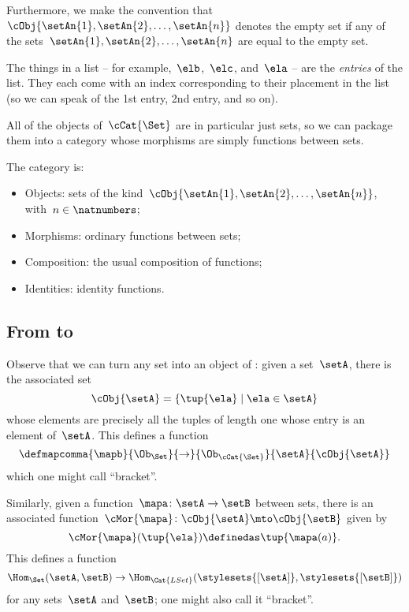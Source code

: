 Furthermore, we make the convention that~$\cObj{\setAn{1}, \setAn{2}, \ldots, \setAn{n}}$ denotes the empty set if any of the sets~$\setAn{1}, \setAn{2}, \ldots , \setAn{n}$ are equal to the empty set.

The things in a list -- for example,~$\elb$,~$\elc$, and~$\ela$ -- are the \emph{entries} of the list.
They each come with an index corresponding to their placement in the list (so we can speak of the 1st entry, 2nd entry, and so on).

All of the objects of~$\cCat{\Set}$ are in particular just sets, so we can package them into a category whose morphisms are simply functions between sets.

\begin{ctdefinition}[\cCat{\Set}]
    The category \cCat{\Set} is:
    \begin{itemize}
        \item Objects: sets of the kind~$\cObj{\setAn{1}, \setAn{2}, \ldots, \setAn{n}}$, with~$n \in \natnumbers$;
        \item Morphisms: ordinary functions between sets;
        \item Composition: the usual composition of functions;
        \item Identities: identity functions.
    \end{itemize}
\end{ctdefinition}

\subsection{From \Set to \cCat{\Set}}

Observe that we can turn any set into an object of \cCat{\Set}: given a set~$\setA$, there is the associated set
\begin{equation*}
    \cObj{\setA} = \{ \tup{\ela} \mid \ela \in \setA \}
\end{equation*}
whose elements are precisely all the tuples of length one whose entry is an element of~$\setA$.
This defines a function
\begin{equation*}
    \defmapcomma{\mapb}{\Ob_{\Set}}
    {\to}
    {\Ob_{\cCat{\Set}}}
    {\setA }
    {\cObj{\setA}}
\end{equation*}
which one might call ``bracket''.

Similarly, given a function~$\mapa \colon \setA \to \setB$ between sets, there is an associated function~$\cMor{ \mapa }\colon \cObj{\setA} \mto \cObj{\setB}$ given by
\begin{equation*}
    \cMor{ \mapa } ( \tup{ \ela }) \definedas \tup{\mapa(a)}.
\end{equation*}
This defines a function
\begin{equation*}
    \Hom_{\Set}(\setA,\setB) \to \Hom_{\Cat{LSet}}(\stylesets{[\setA]},\stylesets{[\setB]})
\end{equation*}
for any sets~$\setA$ and~$\setB$; one might also call it ``bracket''.

